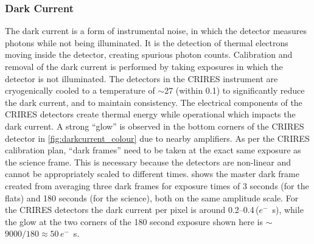 \subsubsection{Dark Current}
\label{subsubsec:darkcurrent}
The dark current is a form of instrumental noise, in which the detector measures photons while not being illuminated.
It is the detection of thermal electrons moving inside the detector, creating spurious photon counts.
Calibration and removal of the dark current is performed by taking exposures in which the detector is not illuminated.
The detectors in the {CRIRES} instrument are cryogenically cooled to a temperature of \(\sim\)27\K{} (within 0.1\K{}) to significantly reduce the dark current, and to maintain consistency.
The electrical components of the {CRIRES} detectors create thermal energy while operational which impacts the dark current.
A strong ``glow'' is observed in the bottom corners of the {CRIRES} detector in \cref{fig:darkcurrent_colour} due to nearby amplifiers.
As per the {CRIRES} calibration plan, ``dark frames'' need to be taken at the exact same exposure as the science frame. This is necessary because the detectors are non-linear and cannot be appropriately scaled to different times.
 shows the master dark frame created from averaging three dark frames for exposure times of 3 seconds (for the flats) and 180 seconds (for the science), both on the same amplitude scale.
For the {CRIRES} detectors the dark current per pixel is around 0.2--0.4\,(\(e^{-}\)\si{\per\second}), while the glow at the two corners of the 180 second exposure shown here is \(\sim\)\(9000 / 180\approx50\)\,\(e^{-}\)\si{\per\second}.

%


